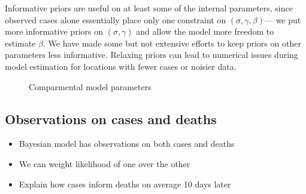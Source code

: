 \documentclass[11pt]{amsart}
\begin{document}
Informative priors are useful on at least some of the internal parameters, since observed cases alone essentially place only one constraint on $(\sigma, \gamma, \beta)$--- we put more informative priors on $(\sigma, \gamma)$ and allow the model more freedom to estimate $\beta$. We have made some but not extensive efforts to keep priors on other parameters less informative. Relaxing priors can lead to numerical issues during model estimation for locations with fewer cases or noisier data.
\begin{figure}
 \begin{center}
\end{center}
      \caption{Comparmental model parameters }
     \label{fig:seird}
 \end{figure}
 
 
 
 
 \subsection{Observations on cases and deaths}
 \begin{itemize}
 \item Bayesian model has observations on both cases and deaths
 \item We can weight likelihood of one over the other
 \item Explain how cases inform deaths on average 10 days later
 \end{itemize}
 
\end{document}
